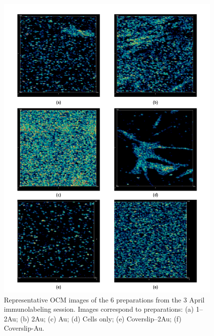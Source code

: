 \begin{figure}[htbp]
\centering
\includegraphics[keepaspectratio,width=\textwidth,height=0.75\textheight]{3aprOCMreps.pdf}
\caption{Representative OCM images of the 6 preparations from the 3 April immunolabeling session. Images correspond to preparations: (a) 1--2Au; (b) 2Au; (c) Au; (d) Cells only; (e) Coverslip--2Au; (f) Coverslip-Au.}
\label{aprocmreps}
\end{figure}




